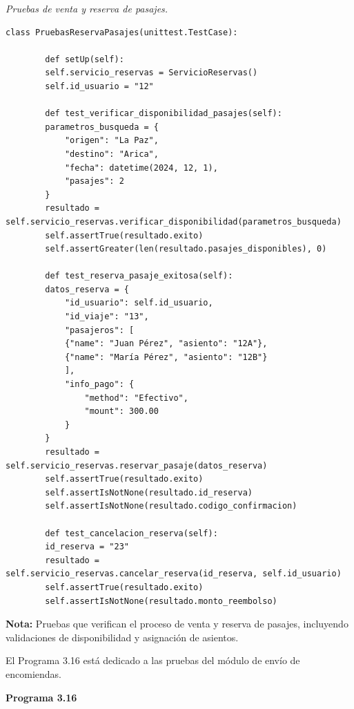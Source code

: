 	\textit{Pruebas de venta y reserva de pasajes.} %
	\vspace{0.3cm} %
	\begin{lstlisting}[lineskip=-1pt]
		class PruebasReservaPasajes(unittest.TestCase):
		
		def setUp(self):
		self.servicio_reservas = ServicioReservas()
		self.id_usuario = "12"
		
		def test_verificar_disponibilidad_pasajes(self):
		parametros_busqueda = {
			"origen": "La Paz",
			"destino": "Arica",
			"fecha": datetime(2024, 12, 1),
			"pasajes": 2
		}
		resultado = self.servicio_reservas.verificar_disponibilidad(parametros_busqueda)
		self.assertTrue(resultado.exito)
		self.assertGreater(len(resultado.pasajes_disponibles), 0)
		
		def test_reserva_pasaje_exitosa(self):
		datos_reserva = {
			"id_usuario": self.id_usuario,
			"id_viaje": "13",
			"pasajeros": [
			{"name": "Juan Pérez", "asiento": "12A"},
			{"name": "María Pérez", "asiento": "12B"}
			],
			"info_pago": {
				"method": "Efectivo",
				"mount": 300.00
			}
		}
		resultado = self.servicio_reservas.reservar_pasaje(datos_reserva)
		self.assertTrue(resultado.exito)
		self.assertIsNotNone(resultado.id_reserva)
		self.assertIsNotNone(resultado.codigo_confirmacion)
		
		def test_cancelacion_reserva(self):
		id_reserva = "23"
		resultado = self.servicio_reservas.cancelar_reserva(id_reserva, self.id_usuario)
		self.assertTrue(resultado.exito)
		self.assertIsNotNone(resultado.monto_reembolso)	
	\end{lstlisting}
	
	\textbf{Nota:} Pruebas que verifican el proceso de venta y reserva de pasajes, incluyendo validaciones de disponibilidad y asignación de asientos.
	
	\vspace{2cm}
	
	El Programa 3.16 está dedicado a las pruebas del módulo de envío de encomiendas.
	
	\textbf{Programa 3.16}
	
